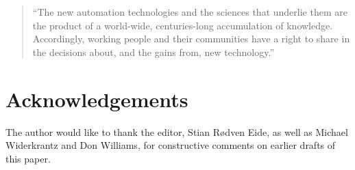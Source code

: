 \begin{quote}
``The new automation technologies and the sciences that underlie them are the
product of a world-wide, centuries-long accumulation of knowledge. Accordingly,
working people and their communities have a right to share in the decisions
about, and the gains from, new technology.''\cite{gnunited-shaiken86}
\end{quote}


\section{Acknowledgements}
\label{s:hackers_gnunited:acknowledgements}

The author would like to thank the editor, Stian Rødven Eide, as well as Michael
Widerkrantz and Don Williams, for constructive comments on earlier drafts of
this paper.
